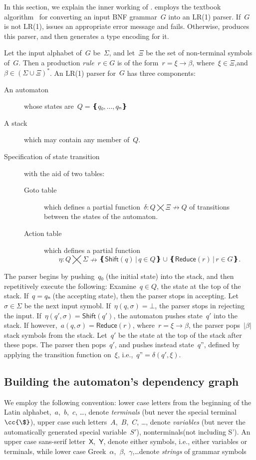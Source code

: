 In this section, we explain the inner working of \Self.
\Self employs the textbook algorithm~\cite{Textbook} for converting an input
  BNF grammar~$G$ into an LR(1) parser.
If~$G$ is not LR(1), \Self issues an
  appropriate error message and fails.
Otherwise, \Self produces this parser, and
  then generates a \Java type encoding for it.

Let the input alphabet of~$G$ be~$Σ$, and let~$Ξ$ be the set of non-terminal symbols
of~$G$.
Then a production \emph{rule}~$r∈G$ is of the form~$r =ξ→β$, where~$ξ∈Ξ$,and~$β∈\left(Σ∪Ξ\right)^*$.
An LR(1) parser for~$G$ has three components:
\begin{description}
  \item[An automaton] whose states are~$Q=❴q₀,…,qₙ❵$
  \item[A stack] which may contain any member of~$Q$.
  \item[Specification of state transition] with the aid of two tables:
        \begin{description}
          \item[Goto table] which defines a partial function~$δ:Q⨉Ξ↛Q$ of transitions
          between the states of the automaton.
          \item[Action table] which
            defines a partial function\[η:Q⨉Σ↛ ❴ \textsf{Shift}(q) \,|\, q∈Q❵ ∪ ❴\textsf{Reduce}(r) \,| \, r∈G❵.\]
        \end{description}
\end{description}
The parser begins by pushing~$q₀$ (the initial state) into the stack,
and then repetitively execute the following:
Examine~$q∈Q$, the state at the top of the stack.
If~$q=qₙ$ (the accepting state), then the parser stops in accepting.
Let~$σ∈Σ$ be the next input symobl.
If~$η(q,σ)=⊥$, the parser stops in rejecting the input.
If~$η(q',σ) = \textsf{Shift}(q')$, the automaton pushes state~$q'$ into the stack.
If however,~$a(q,σ) = \textsf{Reduce}(r)$,
where~$r=ξ→β$,
the parser pops~$|β|$ stack symbols from the stack.
Let~$q'$ be the state at the top of the stack after these pops.
The parser then pops~$q'$, and pushes instead state~$q”$, defined by applying the transition function on~$ξ$, i.e.,~$q”=δ(q',ξ)$.

\subsection{Building the automaton's dependency graph}

  We employ the following convention:
  lower case letters from the beginning of the Latin alphabet,~$a$,~$b$,~$c$, …,
  denote \emph{terminals} (but never the special terminal~$\cc{\$}$),
    upper case such letters~$A$,~$B$,~$C$, …, denote \emph{variables}
  (but never the automatically generated special variable~$S'$),
  nonterminals(not including S').
  An upper case sans-serif letter~$\mathsf X$,~$\mathsf Y$, denote
    either symbols, i.e., either variables or terminals,
    while lower case Greek~$α$,~$β$,~$γ$,…denote \emph{strings} of grammar symbols

